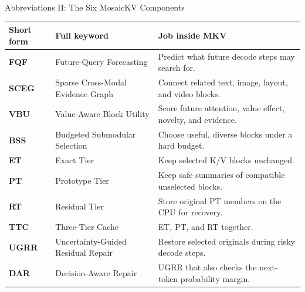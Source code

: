 \documentclass[aspectratio=169,10pt]{beamer}
\begin{document}
\begin{frame}{Abbreviations II: The Six MosaicKV Components}
\scriptsize
\begin{tabularx}{\textwidth}{>{\bfseries}p{}p{}X}
\toprule
Short form & Full keyword & Job inside MKV \\
\midrule
FQF & Future-Query Forecasting & Predict what future decode steps may search for. \\
SCEG & Sparse Cross-Modal Evidence Graph & Connect related text, image, layout, and video blocks. \\
VBU & Value-Aware Block Utility & Score future attention, value effect, novelty, and evidence. \\
BSS & Budgeted Submodular Selection & Choose useful, diverse blocks under a hard budget. \\
ET & Exact Tier & Keep selected K/V blocks unchanged. \\
PT & Prototype Tier & Keep safe summaries of compatible unselected blocks. \\
RT & Residual Tier & Store original PT members on the CPU for recovery. \\
TTC & Three-Tier Cache & ET, PT, and RT together. \\
UGRR & Uncertainty-Guided Residual Repair & Restore selected originals during risky decode steps. \\
DAR & Decision-Aware Repair & UGRR that also checks the next-token probability margin. \\
\bottomrule
\end{tabularx}
\end{frame}
\end{document}
